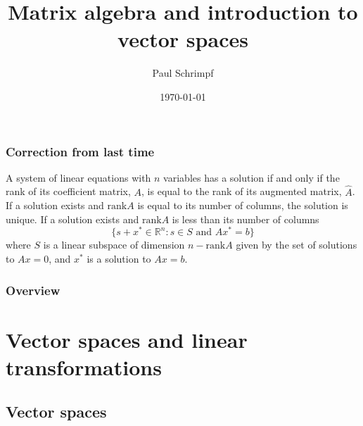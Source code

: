 \documentclass[compress]{beamer}
\title{Matrix algebra and introduction to vector spaces}
\author{Paul Schrimpf}
\institute{UBC \\ Economics 526}
\date{\today}
\newcommand{\rank}{\mathrm{rank}}
\begin{document}
\frame{\titlepage}

\begin{frame}
  \frametitle{Correction from last time}  
  \begin{theorem} \label{thm:rc} A system of
    linear equations with $n$ variables has a solution if and only
    if the rank of its coefficient matrix, $A$, is equal to the rank
    of its augmented matrix, $\hat{A}$. If a solution exists and
    $\rank A$ is equal to its number of columns, the solution is
    unique. If a solution exists and $\rank A$ is less than its
    number of columns 
    \[ 
    \{s+x^* \in \mathbb{R}^n : s \in S \text{ and } Ax^* = b \} 
    \]
    where $S$ is a linear subspace of dimension $n - \rank A$ given by
    the set of solutions to $A x =0$, and $x^*$ is a solution to $A x
    = b$.
  \end{theorem}
\end{frame}

\begin{frame}
  \frametitle{Overview}
  
  \tableofcontents
\end{frame}

\section{Vector spaces and linear transformations}

\subsection{Vector spaces}
\end{document}
